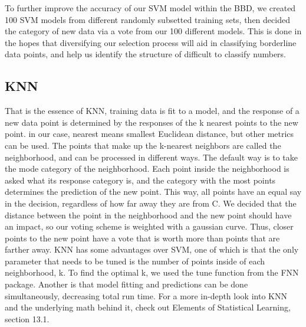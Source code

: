 \documentclass[11pt, oneside]{article}   	%
\begin{document}
To further improve the accuracy of our SVM model within the BBD, we created 100 SVM models from different randomly subsetted training sets, then decided the category of new data via a vote from our 100 different models. This is done in the hopes that diversifying our selection process will aid in classifying borderline data points, and help us identify the structure of difficult to classify numbers.
\subsection{KNN}

That is the essence of KNN, training data is fit to a model, and the response of a new data point is determined by the responses of the k nearest points to the new point. in our case, nearest means smallest Euclidean distance, but other metrics can be used. The points that make up the k-nearest neighbors are called the neighborhood, and can be processed in different ways. The default way is to take the mode category of the neighborhood. Each point inside the neighborhood is asked what its response category is, and the category with the most points determines the prediction of the new point. This way, all points have an equal say in the decision, regardless of how far away they are from C. We decided that the distance between the point in the neighborhood and the new point should have an impact, so our voting scheme is weighted with a gaussian curve. Thus, closer points to the new point have a vote that is worth more than points that are farther away. KNN has some advantages over SVM, one of which is that the only parameter that needs to be tuned is the number of points inside of each neighborhood, k. To find the optimal k, we used the tune function from the FNN package. \cite{FNN} Another is that model fitting and predictions can be done simultaneously, decreasing total run time. For a more in-depth look into KNN and the underlying math behind it, check out Elements of Statistical Learning, section 13.1. \cite{KNNBook}
\end{document}
